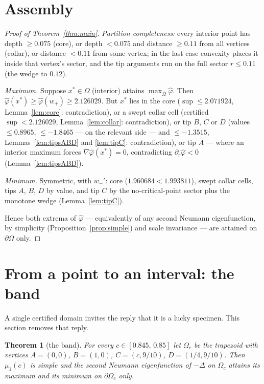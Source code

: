 \documentclass[11pt]{article}
\newtheorem{theorem}{Theorem}
\newcommand{\phih}{\hat\varphi}
\begin{document}
\section{Assembly}\label{sec:assembly}

\begin{proof}[Proof of Theorem~\ref{thm:main}]
\emph{Partition completeness:} every interior point has depth
$\ge0.075$ (core), or depth $<0.075$ and distance $\ge0.11$ from all
vertices (collar), or distance $<0.11$ from some vertex; in the last
case convexity places it inside that vertex's sector, and the tip
arguments run on the full sector $r\le0.11$ (the wedge to $0.12$).

\emph{Maximum.} Suppose $x^*\in\Omega$ (interior) attains
$\max_{\overline\Omega}\phih$. Then
$\phih(x^*)\ge\phih(w_+)\ge2.126029$. But $x^*$ lies in the core
($\sup\le2.071924$, Lemma~\ref{lem:core}: contradiction), or a swept
collar cell (certified $\sup<2.126029$, Lemma~\ref{lem:collar}:
contradiction), or tip $B$, $C$ or $D$ (values $\le0.8965$, $\le-1.8465$
--- on the relevant side --- and $\le-1.3515$, Lemmas~\ref{lem:tipsABD}
and \ref{lem:tipC}: contradiction), or tip $A$ --- where an interior
maximum forces $\nabla\phih(x^*)=0$, contradicting
$\partial_r\phih<0$ (Lemma~\ref{lem:tipsABD}).

\emph{Minimum.} Symmetric, with $w_-'$: core
($1.960684<1.993811$), swept collar cells, tips $A$, $B$, $D$ by value,
and tip $C$ by the no-critical-point sector plus the monotone wedge
(Lemma~\ref{lem:tipC}).

Hence both extrema of $\phih$ --- equivalently of any second Neumann
eigenfunction, by simplicity (Proposition~\ref{prop:simple}) and scale
invariance --- are attained on $\partial\Omega$ only.
\end{proof}

\section{From a point to an interval: the band}\label{sec:band}

A single certified domain invites the reply that it is a lucky specimen.
This section removes that reply.

\begin{theorem}[the band]\label{thm:band}
For every $c\in[0.845,\,0.85]$ let $\Omega_c$ be the trapezoid with
vertices $A=(0,0)$, $B=(1,0)$, $C=(c,9/10)$, $D=(1/4,9/10)$. Then
$\mu_1(c)$ is simple and the second Neumann eigenfunction of $-\Delta$
on $\Omega_c$ attains its maximum and its minimum on $\partial\Omega_c$
only.
\end{theorem}
\end{document}
